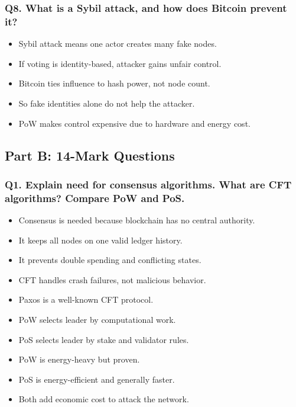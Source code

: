 \documentclass[12pt,a4paper]{article}
\begin{document}
\subsubsection*{Q8. What is a Sybil attack, and how does Bitcoin prevent it?}
\begin{itemize}
\item Sybil attack means one actor creates many fake nodes.
\item If voting is identity-based, attacker gains unfair control.
\item Bitcoin ties influence to hash power, not node count.
\item So fake identities alone do not help the attacker.
\item PoW makes control expensive due to hardware and energy cost.
\end{itemize}

\subsection{Part B: 14-Mark Questions}

\subsubsection*{Q1. Explain need for consensus algorithms. What are CFT algorithms? Compare PoW and PoS.}
\begin{itemize}
\item Consensus is needed because blockchain has no central authority.
\item It keeps all nodes on one valid ledger history.
\item It prevents double spending and conflicting states.
\item CFT handles crash failures, not malicious behavior.
\item Paxos is a well-known CFT protocol.
\item PoW selects leader by computational work.
\item PoS selects leader by stake and validator rules.
\item PoW is energy-heavy but proven.
\item PoS is energy-efficient and generally faster.
\item Both add economic cost to attack the network.
\end{itemize}
\end{document}
